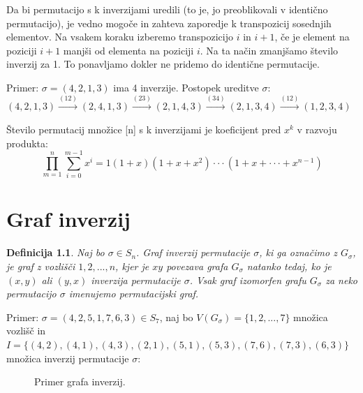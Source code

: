\documentclass[a4paper, 12pt]{book}
\newtheorem{definicija}{Definicija}[chapter]
\begin{document}
Da bi permutacijo s k inverzijami uredili (to je, jo preoblikovali v identično permutacijo), je vedno mogoče in zahteva zaporedje k transpozicij sosednjih elementov. Na vsakem koraku izberemo transpozicijo $i$ in $i+1$, če je element na poziciji $i+1$ manjši od elementa na poziciji $i$. Na ta način zmanjšamo število inverzij za 1. To ponavljamo dokler ne pridemo do identične permutacije.

Primer: $\sigma = (4, 2, 1, 3)$ ima 4 inverzije. Postopek ureditve $\sigma$:\\
$(4, 2, 1, 3) \overset{(12)}{\rightarrow} (2, 4, 1, 3) \overset{(23)}{\rightarrow} (2, 1, 4, 3) \overset{(34)}{\rightarrow} (2, 1, 3, 4) \overset{(12)}{\rightarrow} (1, 2, 3, 4)$

Število permutacij množice [n] s k inverzijami je koeficijent pred $x^k$ v razvoju produkta: 
\[\prod_{m=1}^{n}\sum_{i=0}^{m-1} x^i = 1 (1 + x) (1 + x + x^2) \cdot\cdot\cdot (1 + x + \cdot\cdot\cdot + x^{n-1})\]

\chapter{ Graf inverzij }

\begin{definicija}
    Naj bo $\sigma \in S_n$. Graf inverzij permutacije $\sigma$, ki ga označimo z $G_{\sigma}$,  je graf z vozlišči $1, 2,..., n$, kjer je $xy$ povezava grafa $G_{\sigma}$ natanko tedaj, ko je $(x, y)$ ali $(y, x)$ inverzija permutacije $\sigma$. Vsak graf izomorfen grafu $G_{\sigma}$ za neko permutacijo $\sigma$ imenujemo permutacijski graf.
\end{definicija}

Primer: 
$\sigma = (4, 2, 5, 1, 7, 6, 3) \in S_7$, naj bo $V(G_{\sigma}) = \{ 1, 2, ..., 7\}$ množica vozlišč in $I = \{ (4, 2), (4, 1), (4, 3), (2, 1), (5, 1), (5, 3), (7, 6), (7, 3), (6, 3) \}$ množica inverzij permutacije $\sigma$:

\begin{figure}[h]
    \begin{center}        
    \end{center}
    \caption{Primer grafa inverzij.}
    \label{graf_inverzij}
\end{figure}
\end{document}
